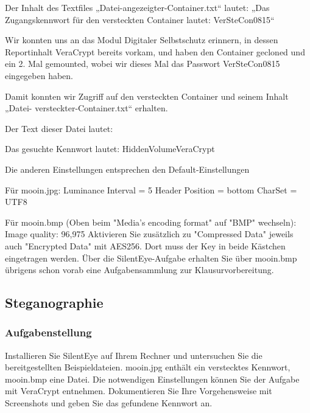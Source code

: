 \documentclass{article}
\begin{document}
Der Inhalt des Textfiles „Datei-angezeigter-Container.txt“ lautet:	„Das 
Zugangskennwort für den versteckten Container lautet: 	VerSteCon0815“

Wir konnten uns an das Modul Digitaler Selbstschutz erinnern, in dessen Reportinhalt 
VeraCrypt bereits vorkam, und haben den Container gecloned und ein 2. Mal gemounted, 
wobei wir dieses Mal das Passwort VerSteCon0815 eingegeben haben.

Damit konnten wir Zugriff auf den versteckten Container und seinem Inhalt „Datei-
versteckter-Container.txt“ erhalten.

Der Text dieser Datei lautet:

Das gesuchte Kennwort lautet: HiddenVolumeVeraCrypt



Die anderen Einstellungen entsprechen den Default-Einstellungen

Für mooin.jpg: 
Luminance Interval = 5 
Header Position = bottom
CharSet = UTF8

Für mooin.bmp (Oben beim "Media's encoding format" auf "BMP" wechseln):
Image quality: 96,975%
Aktivieren Sie zusätzlich zu "Compressed Data" jeweils auch "Encrypted Data" mit AES256. Dort muss der Key in beide Kästchen eingetragen werden.
Über die SilentEye-Aufgabe erhalten Sie über mooin.bmp übrigens schon vorab eine Aufgabensammlung zur Klausurvorbereitung.


\newpage

\subsection{Steganographie}

\subsubsection*{Aufgabenstellung}

Installieren Sie SilentEye  auf Ihrem Rechner und untersuchen Sie die 
bereitgestellten Beispieldateien. mooin.jpg enthält ein verstecktes Kennwort, 
mooin.bmp eine Datei. Die notwendigen Einstellungen können Sie der Aufgabe mit 
VeraCrypt entnehmen. Dokumentieren Sie Ihre Vorgehensweise mit Screenshots und 
geben Sie das gefundene Kennwort an.
\end{document}
